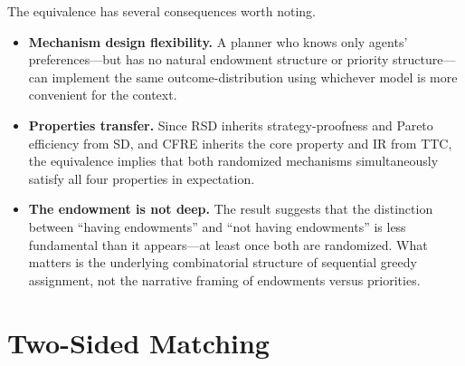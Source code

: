 
The equivalence has several consequences worth noting.
  \begin{itemize}
    \item \textbf{Mechanism design flexibility.} A planner who knows
    only agents' preferences---but has no natural endowment structure
    or priority structure---can implement the same outcome-distribution
    using whichever model is more convenient for the context.
    \item \textbf{Properties transfer.} Since RSD inherits
    strategy-proofness and Pareto efficiency from SD, and CFRE inherits
    the core property and IR from TTC, the equivalence implies that
    both randomized mechanisms simultaneously satisfy all four
    properties in expectation.
    \item \textbf{The endowment is not deep.} The result suggests that
    the distinction between ``having endowments'' and ``not having
    endowments'' is less fundamental than it appears---at least once
    both are randomized. What matters is the underlying combinatorial
    structure of sequential greedy assignment, not the narrative
    framing of endowments versus priorities.
  \end{itemize}

\section{Two-Sided Matching}

